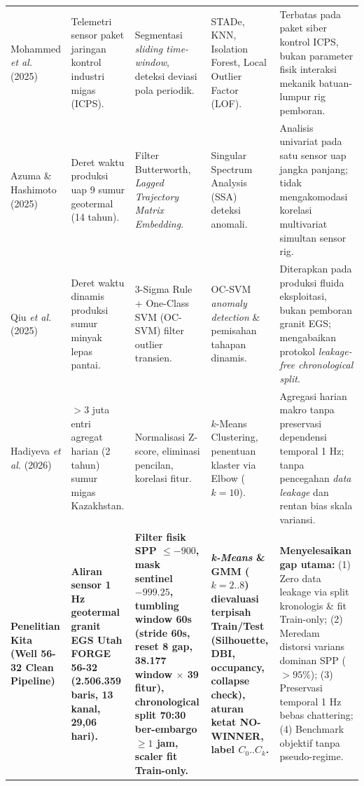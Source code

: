 \documentclass[conference]{IEEEtran}
\begin{document}
\begin{table}[!t]
\begin{tabularx}{\textwidth}{@{}>{\raggedright\arraybackslash}p{2.3cm} X X X X@{}}
\addlinespace
Mohammed \textit{et al.} (2025) \cite{mohammed2025} & Telemetri sensor paket jaringan kontrol industri migas (ICPS). & Segmentasi \textit{sliding time-window}, deteksi deviasi pola periodik. & STADe, KNN, Isolation Forest, Local Outlier Factor (LOF). & Terbatas pada paket siber kontrol ICPS, bukan parameter fisik interaksi mekanik batuan-lumpur rig pemboran. \\
\addlinespace
Azuma \& Hashimoto (2025) \cite{azuma2025} & Deret waktu produksi uap 9 sumur geotermal (14 tahun). & Filter Butterworth, \textit{Lagged Trajectory Matrix Embedding}. & Singular Spectrum Analysis (SSA) deteksi anomali. & Analisis univariat pada satu sensor uap jangka panjang; tidak mengakomodasi korelasi multivariat simultan sensor rig. \\
\addlinespace
Qiu \textit{et al.} (2025) \cite{qiu2025} & Deret waktu dinamis produksi sumur minyak lepas pantai. & 3-Sigma Rule + One-Class SVM (OC-SVM) filter outlier transien. & OC-SVM \textit{anomaly detection} \& pemisahan tahapan dinamis. & Diterapkan pada produksi fluida eksploitasi, bukan pemboran granit EGS; mengabaikan protokol \textit{leakage-free chronological split}. \\
\addlinespace
Hadiyeva \textit{et al.} (2026) \cite{hadiyeva2026} & $>3$ juta entri agregat harian (2 tahun) sumur migas Kazakhstan. & Normalisasi Z-score, eliminasi pencilan, korelasi fitur. & $k$-Means Clustering, penentuan klaster via Elbow ($k=10$). & Agregasi harian makro tanpa preservasi dependensi temporal 1 Hz; tanpa pencegahan \textit{data leakage} dan rentan bias skala variansi. \\
\midrule
\textbf{Penelitian Kita (Well 56-32 Clean Pipeline)} & \textbf{Aliran sensor 1 Hz geotermal granit EGS Utah FORGE 56-32 (2.506.359 baris, 13 kanal, 29,06 hari).} & \textbf{Filter fisik SPP $\le -900$, mask sentinel $-999.25$, tumbling window 60s (stride 60s, reset 8 gap, 38.177 window $\times$ 39 fitur), chronological split 70:30 ber-embargo $\ge 1$ jam, scaler fit Train-only.} & \textbf{\textit{k-Means} \& GMM ($k=2..8$) dievaluasi terpisah Train/Test (Silhouette, DBI, occupancy, collapse check), aturan ketat NO-WINNER, label $C_0..C_k$.} & \textbf{Menyelesaikan gap utama:} (1) Zero data leakage via split kronologis \& fit Train-only; (2) Meredam distorsi varians dominan SPP ($>95\%$); (3) Preservasi temporal 1 Hz bebas chattering; (4) Benchmark objektif tanpa pseudo-regime. \\
\bottomrule
\end{tabularx}
\end{table}
\end{document}
